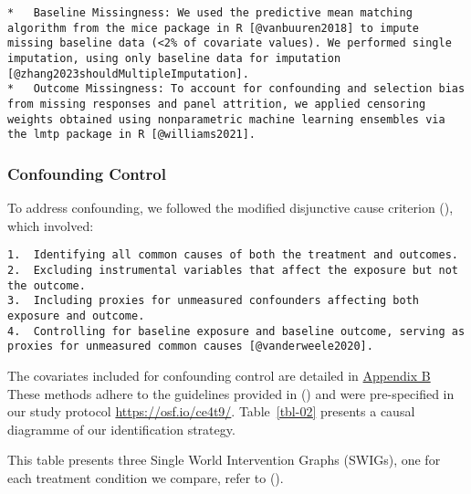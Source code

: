 \documentclass[
  single column]{article}
\begin{document}
\begin{verbatim}
*   Baseline Missingness: We used the predictive mean matching algorithm from the mice package in R [@vanbuuren2018] to impute missing baseline data (<2% of covariate values). We performed single imputation, using only baseline data for imputation [@zhang2023shouldMultipleImputation].
*   Outcome Missingness: To account for confounding and selection bias from missing responses and panel attrition, we applied censoring weights obtained using nonparametric machine learning ensembles via the lmtp package in R [@williams2021].
\end{verbatim}

\subsubsection{Confounding Control}\label{confounding-control}

To address confounding, we followed the modified disjunctive cause
criterion (), which
involved:

\begin{verbatim}
1.  Identifying all common causes of both the treatment and outcomes.
2.  Excluding instrumental variables that affect the exposure but not the outcome.
3.  Including proxies for unmeasured confounders affecting both exposure and outcome.
4.  Controlling for baseline exposure and baseline outcome, serving as proxies for unmeasured common causes [@vanderweele2020].
\end{verbatim}

The covariates included for confounding control are detailed in
\hyperref[appendix-demographics]{Appendix B} These methods adhere to the
guidelines provided in () and were pre-specified in our study protocol
\url{https://osf.io/ce4t9/}. Table~\ref{tbl-02} presents a causal
diagramme of our identification strategy.

\begin{table}

\caption{\label{tbl-02}This table presents three Single World
Intervention Graphs (SWIGs), one for each treatment condition we
compare, refer to ().}

\centering{

\lmtptablethree

}

\end{table}%
\end{document}
